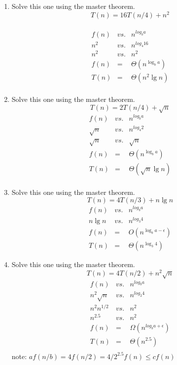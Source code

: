 \documentclass{article}
\begin{document}
\begin{enumerate}
    \item Solve this one using the master theorem.
      \[T(n) = 16T(n/4) + n^2\]
      \\
      \begin{eqnarray*}
        f(n) &vs.& n^{log_b a} \\
        n^2  &vs.& n^{log_{4} 16} \\
        n^2  &vs.& n^2 \\
        f(n) &=& \Theta(n^{\log_b a})\\
        T(n) &=& \Theta(n^2\lg n) \\
      \end{eqnarray*}
      
    \item Solve this one using the master theorem.
      \[T(n) = 2T(n/4) + \sqrt{n}\]
      \begin{eqnarray*}
        f(n) &vs.& n^{log_b a} \\
        \sqrt{n}\  &vs.& n^{log_{4} 2} \\
        \sqrt{n}\  &vs.& \sqrt{n}\ \\
        f(n) &=& \Theta(n^{\log_b a})\\
        T(n) &=& \Theta(\sqrt{n}\lg n) \\
      \end{eqnarray*}
    
    \item Solve this one using the master theorem.
      \[T(n) = 4T(n/3) + n\lg n\]
      \begin{eqnarray*}
        f(n) &vs.& n^{log_b a} \\
        n\lg n\  &vs.& n^{log_{3} 4} \\
        f(n) &=& O(n^{\log_b a-\epsilon})\\
        T(n) &=& \Theta(n^{\log_3 4})
      \end{eqnarray*}
    
    \item Solve this one using the master theorem.
      \[T(n) = 4T(n/2) + n^2\sqrt{n}\]
      \begin{eqnarray*}
        f(n) &vs.& n^{log_b a} \\
        n^2\sqrt{n} &vs.& n^{log_2 4} \\
        n^2n^{1/2} &vs.& n^2 \\
        n^{2.5} &vs.& n^2 \\
        f(n) &=& \Omega(n^{log_b a+\epsilon}) \\
        T(n) &=& \Theta(n^{2.5}) \\       
      \end{eqnarray*}
      note:
      $af(n/b) = 4f(n/2) = 4/2^{2.5}f(n) \leq cf(n)$
    
    \end{enumerate}
    
    
\end{document}
